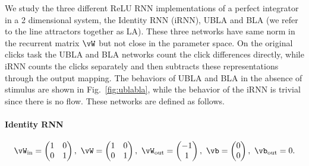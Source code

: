 \documentclass{article} %
\newcounter{ct}
\newcommand{\win}{\vW_{\text{in}}}
\newcommand{\wout}{\vW_{\text{out}}}
\newcommand{\bout}{\vb_{\text{out}}}
\theoremstyle{definition}
\theoremstyle{remark}
\begin{document}
We study the three different ReLU RNN implementations of a perfect integrator in a 2 dimensional system, the Identity RNN (iRNN), UBLA and BLA (we refer to the line attractors together as LA).
These three networks have same norm in the recurrent matrix $\vW$ but not close in the parameter space.
On the original clicks task the UBLA and BLA networks count the click differences directly, while iRNN counts the clicks separately and then subtracts these representations through the output mapping.
The behaviors of UBLA and BLA in the absence of stimulus are shown in Fig.~\ref{fig:ublabla}, while the behavior of the iRNN is trivial since there is no flow. These networks are defined as follows.

\paragraph{Identity RNN~\citep{le2015}}
\label{sec:ubpa,sec:iRNN}
\begin{equation}\label{eq:irnn}
\win = 
\begin{pmatrix}
1  &  0 \\
0 &  1
\end{pmatrix}, \
\vW = 
\begin{pmatrix}
1  &  0 \\
0  &  1
\end{pmatrix}, \
\wout = 
\begin{pmatrix}
-1  \\  1 
\end{pmatrix}, \
\vb = 
\begin{pmatrix}
0  \\ 0
\end{pmatrix}, \
\bout = 0.
\end{equation}

\end{document}

